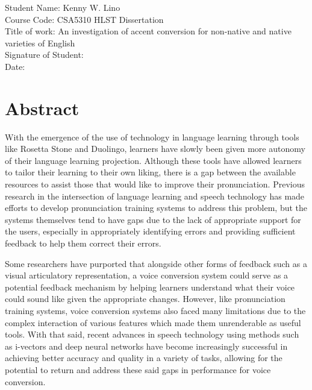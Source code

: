 \documentclass
[
    a4paper,
    twoside,
    12pt,
]
{report}
\begin{document}
       \vspace*{1.5cm}
	     Student Name: Kenny W. Lino \\
       Course Code: CSA5310 HLST Dissertation \\
       Title of work: An investigation of accent conversion for non-native and native varieties of English \\

       \vspace*{1.0cm}
       Signature of Student: \\

       \vspace*{1.0cm}
       Date:

\newpage
\section*{Abstract}

With the emergence of the use of technology in language learning through
tools like Rosetta Stone and Duolingo, learners have slowly been given
more autonomy of their language learning projection. Although these
tools have allowed learners to tailor their learning to their own
liking, there is a gap between the available resources to assist those
that would like to improve their pronunciation. Previous research in the
intersection of language learning and speech technology has made efforts
to develop pronunciation training systems to address this problem, but
the systems themselves tend to have gaps due to the lack of appropriate
support for the users, especially in appropriately identifying errors
and providing sufficient feedback to help them correct their errors.

Some researchers have purported that alongside other forms of feedback
such as a visual articulatory representation, a voice conversion system
could serve as a potential feedback mechanism by helping learners
understand what their voice could sound like given the appropriate
changes. However, like pronunciation training systems, voice conversion
systems also faced many limitations due to the complex interaction of
various features which made them unrenderable as useful tools. With that
said, recent advances in speech technology using methods such as
i-vectors and deep neural networks have become increasingly successful
in achieving better accuracy and quality in a variety of tasks, allowing
for the potential to return and address these said gaps in performance
for voice conversion.
\end{document}
